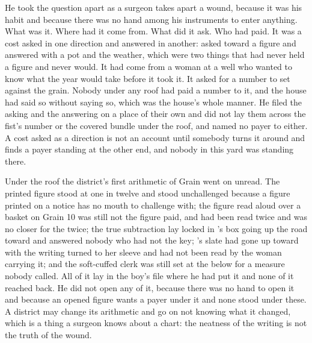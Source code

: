 He took the question apart as a surgeon takes apart a wound, because it was his habit and because there was no hand among his instruments to enter anything. What was it. Where had it come from. What did it ask. Who had paid. It was a cost asked in one direction and answered in another: asked toward a figure and answered with a pot and the weather, which were two things that had never held a figure and never would. It had come from a woman at a well who wanted to know what the year would take before it took it. It asked for a number to set against the grain. Nobody under any roof had paid a number to it, and the house had said so without saying so, which was the house's whole manner. He filed the asking and the answering on a place of their own and did not lay them across the fist's number or the covered bundle under the roof, and named no payer to either. A cost asked as a direction is not an account until somebody turns it around and finds a payer standing at the other end, and nobody in this yard was standing there.

\scenebreak

Under the roof the district's first arithmetic of Grain went on unread. The printed figure stood at one in twelve and stood unchallenged because a figure printed on a notice has no mouth to challenge with; the figure read aloud over a basket on Grain 10 was still not the figure paid, and had been read twice and was no closer for the twice; the true subtraction lay locked in 's box going up the road toward  and answered nobody who had not the key; 's slate had gone up toward  with the writing turned to her sleeve and had not been read by the woman carrying it; and the soft-cuffed clerk was still set at the  below  for a measure nobody called. All of it lay in the boy's file where he had put it and none of it reached back. He did not open any of it, because there was no hand to open it and because an opened figure wants a payer under it and none stood under these. A district may change its arithmetic and go on not knowing what it changed, which is a thing a surgeon knows about a chart: the neatness of the writing is not the truth of the wound.

